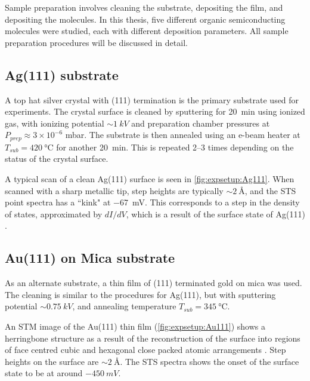 Sample preparation involves cleaning the substrate, depositing the  film, and depositing the molecules. In this thesis, five different organic semiconducting molecules were studied, each with different deposition parameters. All sample preparation procedures will be discussed in detail.

\subsection*{Ag(111) substrate}

A top hat silver crystal with (111) termination is the primary substrate used for experiments. The crystal surface is cleaned by sputtering for \SI{20}{\minute} using ionized  gas, with ionizing potential $\sim \SI{1}{kV}$ and preparation chamber pressures at $P_{prep} \approx 3 \times 10^{-6}$ mbar. The substrate is then annealed using an e-beam heater at $T_{sub} = \SI{420}{\celsius}$ for another \SI{20}{\minute}. This is repeated 2--3 times depending on the status of the crystal surface.

A typical scan of a clean Ag(111) surface is seen in \autoref{fig:expsetup:Ag111}. When scanned with a sharp metallic tip, step heights are typically $\sim\SI{2}{\angstrom}$, and the \ac{STS} point spectra has a ``kink" at \SI{-67}{mV}. This corresponds to a step in the density of states, approximated by $dI/dV$, which is a result of the surface state of Ag(111) \citep{hovel2001modification}.

\begin{figure} [h]
    \centering
    \caption{}
    \label{fig:expsetup:Ag111}
\end{figure}


\subsection*{Au(111) on Mica substrate}

As an alternate substrate, a thin film of (111) terminated gold on mica was used. The cleaning is similar to the procedures for Ag(111), but with sputtering potential $\sim \SI{0.75}{kV}$, and annealing temperature $T_{sub} = \SI{345}{\celsius}$.

An \ac{STM} image of the Au(111) thin film (\autoref{fig:expsetup:Au111}) shows a herringbone structure as a result of the reconstruction of the surface into regions of face centred cubic and hexagonal close packed atomic arrangements . Step heights on the surface are $\sim \SI{2}{\angstrom}$. The \ac{STS} spectra shows the onset of the surface state to be at around $\SI{-450}{mV}$.

